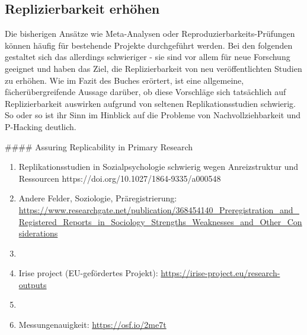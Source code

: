 \documentclass[
  letterpaper,
  DIV=11,
  numbers=noendperiod]{scrreprt}
\begin{document}
\subsection{Replizierbarkeit erhöhen}\label{replizierbarkeit-erhuxf6hen}

Die bisherigen Ansätze wie Meta-Analysen oder
Reproduzierbarkeits-Prüfungen können häufig für bestehende Projekte
durchgeführt werden. Bei den folgenden gestaltet sich das allerdings
schwieriger - sie sind vor allem für neue Forschung geeignet und haben
das Ziel, die Replizierbarkeit von neu veröffentlichten Studien zu
erhöhen. Wie im Fazit des Buches erörtert, ist eine allgemeine,
fächerübergreifende Aussage darüber, ob diese Vorschläge sich
tatsächlich auf Replizierbarkeit auswirken aufgrund von seltenen
Replikationsstudien schwierig. So oder so ist ihr Sinn im Hinblick auf
die Probleme von Nachvollziehbarkeit und P-Hacking deutlich.

\#\#\#\# Assuring Replicability in Primary Research

\begin{enumerate}
\def\labelenumi{\arabic{enumi}.}
\item
  Replikationsstudien in Sozialpsychologie schwierig wegen
  Anreizstruktur und Ressourcen
  https://doi.org/10.1027/1864-9335/a000548
\item
  Andere Felder, Soziologie, Präregistrierung:
  \url{https://www.researchgate.net/publication/368454140_Preregistration_and_Registered_Reports_in_Sociology_Strengths_Weaknesses_and_Other_Considerations}
\item
\item
  Irise project (EU-gefördertes Projekt):
  \url{https://irise-project.eu/research-outputs}
\item
\item
  Messungenauigkeit: \url{https://osf.io/2me7t}
\end{enumerate}
\end{document}

